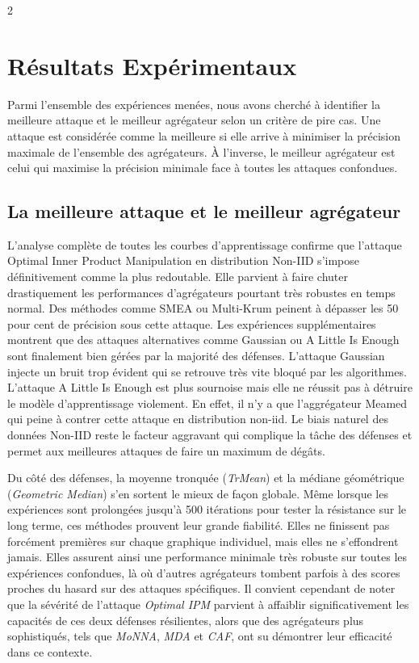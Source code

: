 \documentclass{article}
\begin{document}
\begin{multicols}{2}
\section{R\'esultats Exp\'erimentaux}

Parmi l'ensemble des exp\'eriences men\'ees, nous avons cherch\'e \`a identifier la meilleure attaque et le meilleur agr\'egateur selon un crit\`ere de pire cas. Une attaque est consid\'er\'ee comme la meilleure si elle arrive \`a minimiser la pr\'ecision maximale de l'ensemble des agr\'egateurs. \`A l'inverse, le meilleur agr\'egateur est celui qui maximise la pr\'ecision minimale face \`a toutes les attaques confondues.

\subsection{La meilleure attaque et le meilleur agr\'egateur}

L'analyse compl\`ete de toutes les courbes d'apprentissage confirme que l'attaque Optimal Inner Product Manipulation en distribution Non-IID s'impose d\'efinitivement comme la plus redoutable. Elle parvient \`a faire chuter drastiquement les performances d'agr\'egateurs pourtant tr\`es robustes en temps normal. Des m\'ethodes comme SMEA ou Multi-Krum peinent \`a d\'epasser les 50 pour cent de pr\'ecision sous cette attaque. Les exp\'eriences suppl\'ementaires montrent que des attaques alternatives comme Gaussian ou A Little Is Enough sont finalement bien g\'er\'ees par la majorit\'e des d\'efenses. L'attaque Gaussian injecte un bruit trop \'evident qui se retrouve tr\`es vite bloqu\'e par les algorithmes. L'attaque A Little Is Enough est plus sournoise mais elle ne r\'eussit pas \`a d\'etruire le mod\`ele d'apprentissage violement. En effet, il n'y a que l'aggrégateur Meamed qui peine à contrer cette attaque en distribution non-iid. Le biais naturel des donn\'ees Non-IID reste le facteur aggravant qui complique la t\^ache des d\'efenses et permet aux meilleures attaques de faire un maximum de d\'eg\^ats.

Du c\^ot\'e des d\'efenses, la moyenne tronqu\'ee (\textit{TrMean}) et la m\'ediane g\'eom\'etrique (\textit{Geometric Median}) s'en sortent le mieux de fa\c{c}on globale. M\^eme lorsque les exp\'eriences sont prolong\'ees jusqu'\`a 500 it\'erations pour tester la r\'esistance sur le long terme, ces m\'ethodes prouvent leur grande fiabilit\'e. Elles ne finissent pas forc\'ement premi\`eres sur chaque graphique individuel, mais elles ne s'effondrent jamais. Elles assurent ainsi une performance minimale tr\`es robuste sur toutes les exp\'eriences confondues, l\`a o\`u d'autres agr\'egateurs tombent parfois \`a des scores proches du hasard sur des attaques sp\'ecifiques. Il convient cependant de noter que la s\'ev\'erit\'e de l'attaque \textit{Optimal IPM} parvient \`a affaiblir significativement les capacit\'es de ces deux d\'efenses r\'esilientes, alors que des agr\'egateurs plus sophistiqu\'es, tels que \textit{MoNNA}, \textit{MDA} et \textit{CAF}, ont su d\'emontrer leur efficacit\'e dans ce contexte.


\end{multicols}
\end{document}
